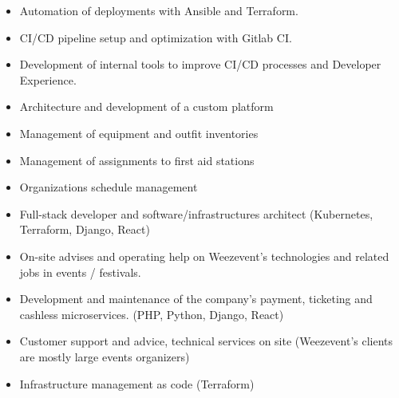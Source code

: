 
\begin{itemize}
    \item Automation of deployments with Ansible and Terraform.
    \item CI/CD pipeline setup and optimization with Gitlab CI.
    \item Development of internal tools to improve CI/CD processes and Developer Experience.
\end{itemize}

\divider

\begin{itemize}
    \item Architecture and development of a custom platform
    \item Management of equipment and outfit inventories
    \item Management of assignments to first aid stations
    \item Organizations schedule management
\end{itemize}

\divider

\begin{itemize}
    \item Full-stack developer and software/infrastructures architect (Kubernetes, Terraform, Django, React)
\end{itemize}

\divider

\begin{itemize}
    \item On-site advises and operating help on Weezevent's technologies and related jobs in events / festivals.
\end{itemize}

\divider

\begin{itemize}
    \item Development and maintenance of the company's payment, ticketing and cashless microservices. (PHP, Python, Django, React)
    \item Customer support and advice, technical services on site (Weezevent's clients are mostly large events organizers)
    \item Infrastructure management as code (Terraform)
\end{itemize}

